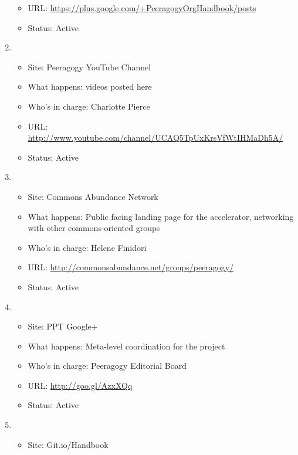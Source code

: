\begin{enumerate}
\begin{itemize}
  \item
    URL:
    \href{https://plus.google.com/+PeeragogyOrgHandbook/posts}{https://plus.google.com/+PeeragogyOrgHandbook/posts}
  \item
    Status: Active
  \end{itemize}
\item
  \begin{itemize}
  \itemsep1pt\parskip0pt
  \item
    Site: Peeragogy YouTube Channel
  \item
    What happens: videos posted here
  \item
    Who's in charge: Charlotte Pierce
  \item
    URL:
    \href{http://www.youtube.com/channel/UCAQ5TpUxKrsVfWtIHMaDh5A/about}{http://www.youtube.com/channel/UCAQ5TpUxKrsVfWtIHMaDh5A/}
  \item
    Status: Active
  \end{itemize}
\item
  \begin{itemize}
  \itemsep1pt\parskip0pt
  \item
    Site: Commons Abundance Network
  \item
    What happens: Public facing landing page for the accelerator,
    networking with other commons-oriented groups
  \item
    Who's in charge: Helene Finidori
  \item
    URL:
    \href{http://commonsabundance.net/groups/peeragogy/}{http://commonsabundance.net/groups/peeragogy/}
  \item
    Status: Active
  \end{itemize}
\item
  \begin{itemize}
  \itemsep1pt\parskip0pt
  \item
    Site: PPT Google+
  \item
    What happens: Meta-level coordination for the project
  \item
    Who's in charge: Peeragogy Editorial Board
  \item
    URL: \href{http://goo.gl/AzxXQq}{http://goo.gl/AzxXQq}
  \item
    Status: Active
  \end{itemize}
\item
  \begin{itemize}
  \itemsep1pt\parskip0pt
  \item
    Site: Git.io/Handbook

\end{itemize}
\end{enumerate}
